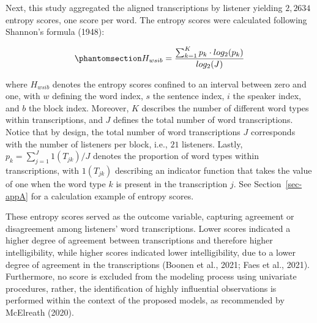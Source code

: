 \documentclass[
]{agujournal2019}
\begin{document}
Next, this study aggregated the aligned transcriptions by listener
yielding \(2,2634\) entropy scores, one score per word. The entropy
scores were calculated following Shannon's formula (1948):

\begin{equation}\phantomsection\label{eq-entropy}{
H_{wsib} = \frac{ \sum_{k=1}^{K} p_{k} \cdot log_{2}(p_{k}) }{ log_{2}(J)}
}\end{equation}

where \(H_{wsib}\) denotes the entropy scores confined to an interval
between zero and one, with \(w\) defining the word index, \(s\) the
sentence index, \(i\) the speaker index, and \(b\) the block index.
Moreover, \(K\) describes the number of different word types within
transcriptions, and \(J\) defines the total number of word
transcriptions. Notice that by design, the total number of word
transcriptions \(J\) corresponds with the number of listeners per block,
i.e., \(21\) listeners. Lastly, \(p_{k} = \sum_{j=1}^{J} 1(T_{jk}) / J\)
denotes the proportion of word types within transcriptions, with
\(1(T_{jk})\) describing an indicator function that takes the value of
one when the word type \(k\) is present in the transcription \(j\). See
Section~\ref{sec-appA} for a calculation example of entropy scores.

These entropy scores served as the outcome variable, capturing agreement
or disagreement among listeners' word transcriptions. Lower scores
indicated a higher degree of agreement between transcriptions and
therefore higher intelligibility, while higher scores indicated lower
intelligibility, due to a lower degree of agreement in the
transcriptions (Boonen et al., 2021; Faes et al., 2021). Furthermore, no
score is excluded from the modeling process using univariate procedures,
rather, the identification of highly influential observations is
performed within the context of the proposed models, as recommended by
McElreath (2020).
\end{document}

